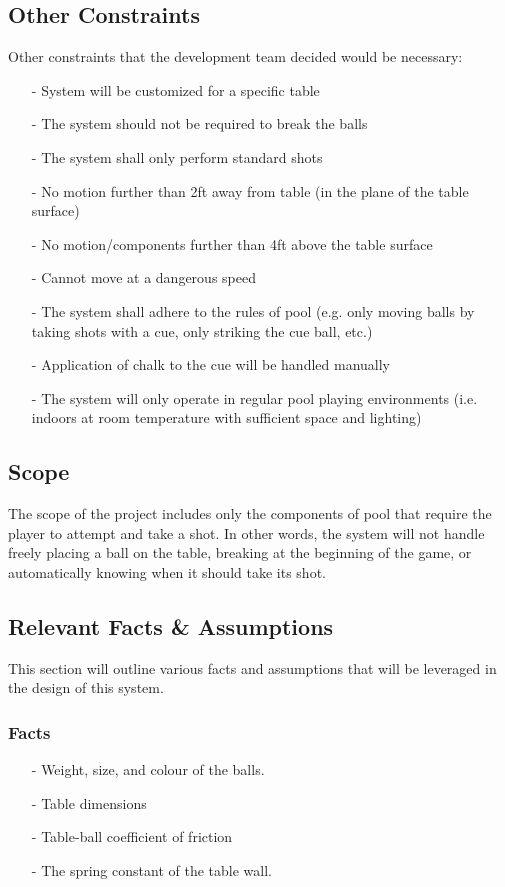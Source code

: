 \documentclass[titlepage]{article}
\begin{document}
\subsection{Other Constraints}
Other constraints that the development team decided would be necessary:
\begin{itemize}
	\item[-] System will be customized for a specific table
	\item[-] The system should not be required to break the balls
	\item[-] The system shall only perform standard shots
	\item[-] No motion further than 2ft away from table (in the plane of the table surface)
	\item[-] No motion/components further than 4ft above the table surface
	\item[-] Cannot move at a dangerous speed
	\item[-] The system shall adhere to the rules of pool (e.g. only moving balls by taking shots with a cue, only striking the cue ball, etc.)
	\item[-] Application of chalk to the cue will be handled manually
	\item[-] The system will only operate in regular pool playing environments (i.e. indoors at room temperature with sufficient space and lighting)
\end{itemize}

\subsection{Scope}
The scope of the project includes only the components of pool that require the player to attempt and take a shot. In other words, the system will not handle freely placing a ball on the table, breaking at the beginning of the game, or automatically knowing when it should take its shot.

\subsection{Relevant Facts \& Assumptions}
This section will outline various facts and assumptions that will be leveraged in the design of this system.
\subsubsection{Facts}
\begin{itemize}
	\item[-] Weight, size, and colour of the balls.
	\item[-] Table dimensions
	\item[-] Table-ball coefficient of friction
	\item[-] The spring constant of the table wall.
\end{itemize}
\end{document}
